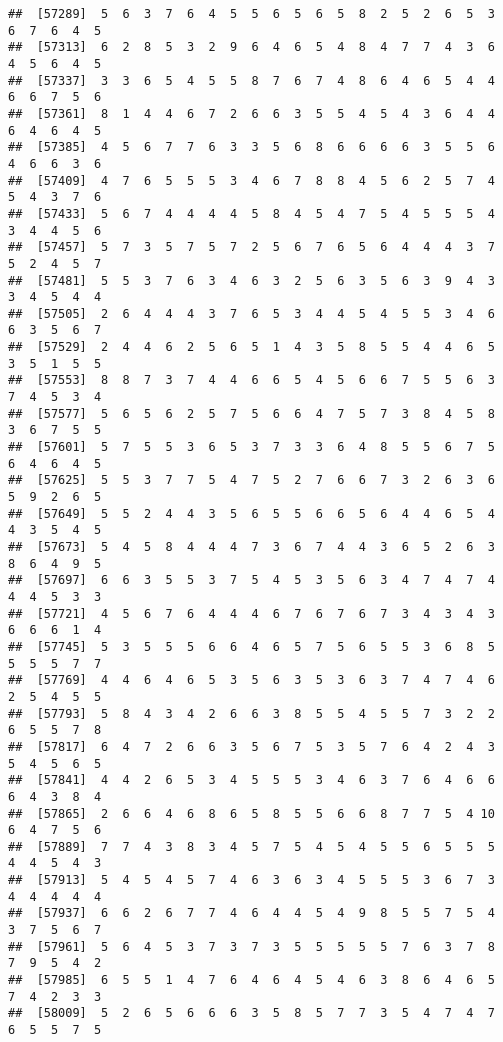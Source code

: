 \documentclass[
]{book}
\begin{document}
\begin{verbatim}
##  [57289]  5  6  3  7  6  4  5  5  6  5  6  5  8  2  5  2  6  5  3  6  7  6  4  5
##  [57313]  6  2  8  5  3  2  9  6  4  6  5  4  8  4  7  7  4  3  6  4  5  6  4  5
##  [57337]  3  3  6  5  4  5  5  8  7  6  7  4  8  6  4  6  5  4  4  6  6  7  5  6
##  [57361]  8  1  4  4  6  7  2  6  6  3  5  5  4  5  4  3  6  4  4  6  4  6  4  5
##  [57385]  4  5  6  7  7  6  3  3  5  6  8  6  6  6  6  3  5  5  6  4  6  6  3  6
##  [57409]  4  7  6  5  5  5  3  4  6  7  8  8  4  5  6  2  5  7  4  5  4  3  7  6
##  [57433]  5  6  7  4  4  4  4  5  8  4  5  4  7  5  4  5  5  5  4  3  4  4  5  6
##  [57457]  5  7  3  5  7  5  7  2  5  6  7  6  5  6  4  4  4  3  7  5  2  4  5  7
##  [57481]  5  5  3  7  6  3  4  6  3  2  5  6  3  5  6  3  9  4  3  3  4  5  4  4
##  [57505]  2  6  4  4  4  3  7  6  5  3  4  4  5  4  5  5  3  4  6  6  3  5  6  7
##  [57529]  2  4  4  6  2  5  6  5  1  4  3  5  8  5  5  4  4  6  5  3  5  1  5  5
##  [57553]  8  8  7  3  7  4  4  6  6  5  4  5  6  6  7  5  5  6  3  7  4  5  3  4
##  [57577]  5  6  5  6  2  5  7  5  6  6  4  7  5  7  3  8  4  5  8  3  6  7  5  5
##  [57601]  5  7  5  5  3  6  5  3  7  3  3  6  4  8  5  5  6  7  5  6  4  6  4  5
##  [57625]  5  5  3  7  7  5  4  7  5  2  7  6  6  7  3  2  6  3  6  5  9  2  6  5
##  [57649]  5  5  2  4  4  3  5  6  5  5  6  6  5  6  4  4  6  5  4  4  3  5  4  5
##  [57673]  5  4  5  8  4  4  4  7  3  6  7  4  4  3  6  5  2  6  3  8  6  4  9  5
##  [57697]  6  6  3  5  5  3  7  5  4  5  3  5  6  3  4  7  4  7  4  4  4  5  3  3
##  [57721]  4  5  6  7  6  4  4  4  6  7  6  7  6  7  3  4  3  4  3  6  6  6  1  4
##  [57745]  5  3  5  5  5  6  6  4  6  5  7  5  6  5  5  3  6  8  5  5  5  5  7  7
##  [57769]  4  4  6  4  6  5  3  5  6  3  5  3  6  3  7  4  7  4  6  2  5  4  5  5
##  [57793]  5  8  4  3  4  2  6  6  3  8  5  5  4  5  5  7  3  2  2  6  5  5  7  8
##  [57817]  6  4  7  2  6  6  3  5  6  7  5  3  5  7  6  4  2  4  3  5  4  5  6  5
##  [57841]  4  4  2  6  5  3  4  5  5  5  3  4  6  3  7  6  4  6  6  6  4  3  8  4
##  [57865]  2  6  6  4  6  8  6  5  8  5  5  6  6  8  7  7  5  4 10  6  4  7  5  6
##  [57889]  7  7  4  3  8  3  4  5  7  5  4  5  4  5  5  6  5  5  5  4  4  5  4  3
##  [57913]  5  4  5  4  5  7  4  6  3  6  3  4  5  5  5  3  6  7  3  4  4  4  4  4
##  [57937]  6  6  2  6  7  7  4  6  4  4  5  4  9  8  5  5  7  5  4  3  7  5  6  7
##  [57961]  5  6  4  5  3  7  3  7  3  5  5  5  5  5  7  6  3  7  8  7  9  5  4  2
##  [57985]  6  5  5  1  4  7  6  4  6  4  5  4  6  3  8  6  4  6  5  7  4  2  3  3
##  [58009]  5  2  6  5  6  6  6  3  5  8  5  7  7  3  5  4  7  4  7  6  5  5  7  5

\end{verbatim}
\end{document}
